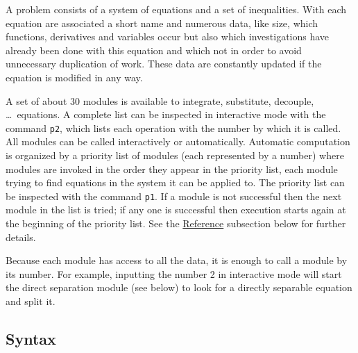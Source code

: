 A problem consists of a system of equations and a set of inequalities.
With each equation are associated a short name and numerous data, like
size, which functions, derivatives and variables occur but also which
investigations have already been done with this equation and which not
in order to avoid unnecessary duplication of work.  These data are
constantly updated if the equation is modified in any way.

A set of about 30 modules is available to integrate, substitute,
decouple, \ldots\ equations.  A complete list can be inspected in
interactive mode with the command \texttt{p2}, which lists each
operation with the number by which it is called.  All modules can be
called interactively or automatically.  Automatic computation is
organized by a priority list of modules (each represented by a number)
where modules are invoked in the order they appear in the priority
list, each module trying to find equations in the system it can be
applied to.  The priority list can be inspected with the command
\texttt{p1}.  If a module is not successful then the next module in
the list is tried; if any one is successful then execution starts
again at the beginning of the priority list.  See the
\hyperref[crack-lb1]{Reference} subsection below for further details.

Because each module has access to all the data, it is enough to call a
module by its number.  For example, inputting the number 2 in
interactive mode will start the direct separation module (see below)
to look for a directly separable equation and split it.

\subsection{Syntax}

